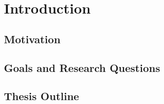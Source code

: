 \documentclass[english, BCOR=6mm, twoside=true, open=right]{tudscrreprt}
\begin{document}

\maketitle




\confirmation[pagestyle=empty.tudheadings]
\cleardoublepage


% 

\tableofcontents

\chapter{Introduction}

\section{Motivation}

\section{Goals and Research Questions}

\section{Thesis Outline}



% 
% 
% 
\end{document}
